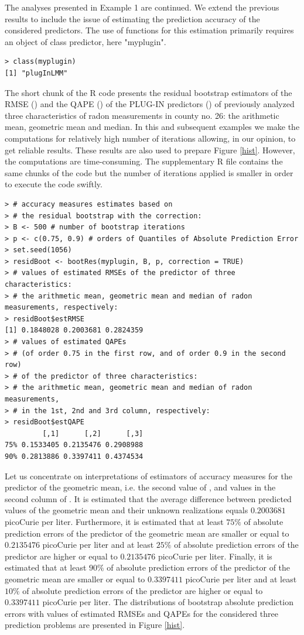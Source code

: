 The analyses presented in Example 1 are continued. We extend the previous results to include the issue of estimating the prediction accuracy of the considered predictors. The use of functions for this estimation primarily requires an object of class predictor, here  "myplugin".
\begin{verbatim}
> class(myplugin)
[1] "plugInLMM"
\end{verbatim}
The short chunk of the R code presents the residual bootstrap estimators of the RMSE () and the QAPE () of the PLUG-IN predictors () of previously analyzed three characteristics of radon measurements in county no. 26: the arithmetic mean, geometric mean and median. In this and subsequent examples we make the computations for relatively high number of iterations allowing, in our opinion, to get reliable results. These results are also used to prepare Figure \ref{hist}. However, the computations are time-consuming. The supplementary R file contains the same chunks of the code but the number of iterations applied is smaller in order to execute the code swiftly.
\begin{verbatim}
> # accuracy measures estimates based on
> # the residual bootstrap with the correction:
> B <- 500 # number of bootstrap iterations
> p <- c(0.75, 0.9) # orders of Quantiles of Absolute Prediction Error
> set.seed(1056)
> residBoot <- bootRes(myplugin, B, p, correction = TRUE)
> # values of estimated RMSEs of the predictor of three characteristics:
> # the arithmetic mean, geometric mean and median of radon measurements, respectively:
> residBoot$estRMSE
[1] 0.1848028 0.2003681 0.2824359
> # values of estimated QAPEs
> # (of order 0.75 in the first row, and of order 0.9 in the second row)
> # of the predictor of three characteristics:
> # the arithmetic mean, geometric mean and median of radon measurements,
> # in the 1st, 2nd and 3rd column, respectively:
> residBoot$estQAPE
         [,1]      [,2]      [,3]
75% 0.1533405 0.2135476 0.2908988
90% 0.2813886 0.3397411 0.4374534
\end{verbatim}

Let us concentrate on interpretations of estimators of accuracy measures for the predictor of the geometric mean, i.e. the second value of , and values in the second column of . It is estimated that the average difference between predicted values of the geometric mean  and their unknown realizations equals $0.2003681$ picoCurie per liter. Furthermore, it is estimated that at least $75\%$ of absolute prediction errors of the predictor of the geometric mean are smaller or equal to $0.2135476$ picoCurie per liter and at least $25\%$ of absolute prediction errors of the predictor are higher or equal to $0.2135476$ picoCurie per liter. Finally, it is estimated that at least $90\%$ of absolute prediction errors of the predictor of the geometric mean are smaller or equal to $0.3397411$ picoCurie per liter and at least $10\%$ of absolute prediction errors of the predictor are higher or equal to $0.3397411$ picoCurie per liter. The distributions of bootstrap absolute prediction errors with values of estimated RMSEs and QAPEs for the considered three prediction problems are presented in Figure \ref{hist}.


